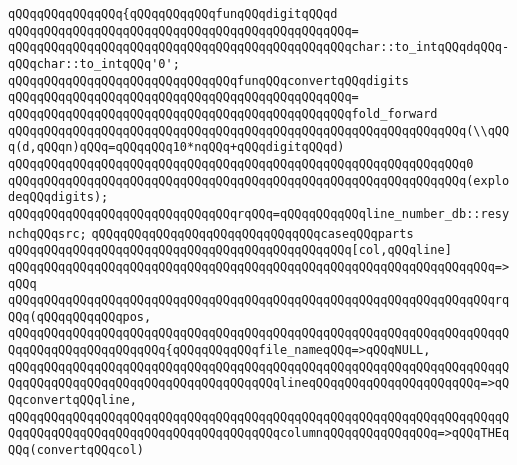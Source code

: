 \verb|qQQqqQQqqQQqqQQq{qQQqqQQqqQQqfunqQQqdigitqQQqd|\newline
\verb|qQQqqQQqqQQqqQQqqQQqqQQqqQQqqQQqqQQqqQQqqQQqqQQq=|\newline
\verb|qQQqqQQqqQQqqQQqqQQqqQQqqQQqqQQqqQQqqQQqqQQqqQQqchar::to_intqQQqdqQQq-qQQqchar::to_intqQQq'0';|\newline
\newline
\verb|qQQqqQQqqQQqqQQqqQQqqQQqqQQqqQQqfunqQQqconvertqQQqdigits|\newline
\verb|qQQqqQQqqQQqqQQqqQQqqQQqqQQqqQQqqQQqqQQqqQQqqQQq=|\newline
\verb|qQQqqQQqqQQqqQQqqQQqqQQqqQQqqQQqqQQqqQQqqQQqqQQqfold_forward|\newline
\verb|qQQqqQQqqQQqqQQqqQQqqQQqqQQqqQQqqQQqqQQqqQQqqQQqqQQqqQQqqQQqqQQq(\\qQQq(d,qQQqn)qQQq=qQQqqQQq10*nqQQq+qQQqdigitqQQqd)|\newline
\verb|qQQqqQQqqQQqqQQqqQQqqQQqqQQqqQQqqQQqqQQqqQQqqQQqqQQqqQQqqQQqqQQq0|\newline
\verb|qQQqqQQqqQQqqQQqqQQqqQQqqQQqqQQqqQQqqQQqqQQqqQQqqQQqqQQqqQQqqQQq(explodeqQQqdigits);|\newline
\newline
\verb|qQQqqQQqqQQqqQQqqQQqqQQqqQQqqQQqrqQQq=qQQqqQQqqQQqline_number_db::resynchqQQqsrc;|\newline
\newline
\verb|qQQqqQQqqQQqqQQqqQQqqQQqqQQqqQQqcaseqQQqparts|\newline
\newline
\verb|qQQqqQQqqQQqqQQqqQQqqQQqqQQqqQQqqQQqqQQqqQQqqQQq[col,qQQqline]|\newline
\verb|qQQqqQQqqQQqqQQqqQQqqQQqqQQqqQQqqQQqqQQqqQQqqQQqqQQqqQQqqQQqqQQqqQQq=>qQQq|\newline
\verb|qQQqqQQqqQQqqQQqqQQqqQQqqQQqqQQqqQQqqQQqqQQqqQQqqQQqqQQqqQQqqQQqqQQqrqQQq(qQQqqQQqqQQqpos,|\newline
\verb|qQQqqQQqqQQqqQQqqQQqqQQqqQQqqQQqqQQqqQQqqQQqqQQqqQQqqQQqqQQqqQQqqQQqqQQqqQQqqQQqqQQqqQQqqQQq{qQQqqQQqqQQqfile_nameqQQq=>qQQqNULL,|\newline
\verb|qQQqqQQqqQQqqQQqqQQqqQQqqQQqqQQqqQQqqQQqqQQqqQQqqQQqqQQqqQQqqQQqqQQqqQQqqQQqqQQqqQQqqQQqqQQqqQQqqQQqqQQqqQQqlineqQQqqQQqqQQqqQQqqQQqqQQq=>qQQqconvertqQQqline,|\newline
\verb|qQQqqQQqqQQqqQQqqQQqqQQqqQQqqQQqqQQqqQQqqQQqqQQqqQQqqQQqqQQqqQQqqQQqqQQqqQQqqQQqqQQqqQQqqQQqqQQqqQQqqQQqqQQqcolumnqQQqqQQqqQQqqQQq=>qQQqTHEqQQq(convertqQQqcol)|\newline
